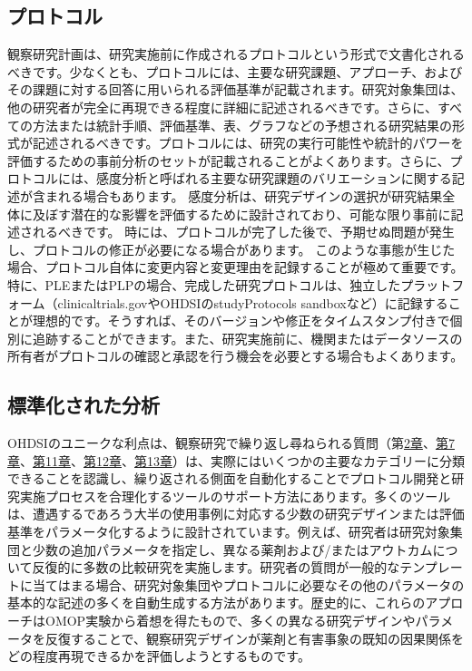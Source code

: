 \documentclass[
  11pt]{book}
\theoremstyle{definition}
\theoremstyle{definition}
\theoremstyle{definition}
\theoremstyle{definition}
\theoremstyle{remark}
\begin{document}
\subsection{プロトコル}\label{ux30d7ux30edux30c8ux30b3ux30eb}


観察研究計画は、研究実施前に作成されるプロトコルという形式で文書化されるべきです。少なくとも、プロトコルには、主要な研究課題、アプローチ、およびその課題に対する回答に用いられる評価基準が記載されます。研究対象集団は、他の研究者が完全に再現できる程度に詳細に記述されるべきです。さらに、すべての方法または統計手順、評価基準、表、グラフなどの予想される研究結果の形式が記述されるべきです。プロトコルには、研究の実行可能性や統計的パワーを評価するための事前分析のセットが記載されることがよくあります。さらに、プロトコルには、感度分析と呼ばれる主要な研究課題のバリエーションに関する記述が含まれる場合もあります。 感度分析は、研究デザインの選択が研究結果全体に及ぼす潜在的な影響を評価するために設計されており、可能な限り事前に記述されるべきです。 時には、プロトコルが完了した後で、予期せぬ問題が発生し、プロトコルの修正が必要になる場合があります。 このような事態が生じた場合、プロトコル自体に変更内容と変更理由を記録することが極めて重要です。特に、PLEまたはPLPの場合、完成した研究プロトコルは、独立したプラットフォーム（clinicaltrials.govやOHDSIのstudyProtocols sandboxなど）に記録することが理想的です。そうすれば、そのバージョンや修正をタイムスタンプ付きで個別に追跡することができます。また、研究実施前に、機関またはデータソースの所有者がプロトコルの確認と承認を行う機会を必要とする場合もよくあります。

\subsection{標準化された分析}\label{ux6a19ux6e96ux5316ux3055ux308cux305fux5206ux6790}

OHDSIのユニークな利点は、観察研究で繰り返し尋ねられる質問（第\href{https://ohdsi.github.io/TheBookOfOhdsi/WhereToBegin.html\#WhereToBegin}{2章}、\href{https://ohdsi.github.io/TheBookOfOhdsi/DataAnalyticsUseCases.html\#DataAnalyticsUseCases}{第7章}、\href{https://ohdsi.github.io/TheBookOfOhdsi/Characterization.html\#Characterization}{第11章}、\href{https://ohdsi.github.io/TheBookOfOhdsi/PopulationLevelEstimation.html\#PopulationLevelEstimation}{第12章}、\href{https://ohdsi.github.io/TheBookOfOhdsi/PatientLevelPrediction.html\#PatientLevelPrediction}{第13章}）は、実際にはいくつかの主要なカテゴリーに分類できることを認識し、繰り返される側面を自動化することでプロトコル開発と研究実施プロセスを合理化するツールのサポート方法にあります。多くのツールは、遭遇するであろう大半の使用事例に対応する少数の研究デザインまたは評価基準をパラメータ化するように設計されています。例えば、研究者は研究対象集団と少数の追加パラメータを指定し、異なる薬剤および/またはアウトカムについて反復的に多数の比較研究を実施します。研究者の質問が一般的なテンプレートに当てはまる場合、研究対象集団やプロトコルに必要なその他のパラメータの基本的な記述の多くを自動生成する方法があります。歴史的に、これらのアプローチはOMOP実験から着想を得たもので、多くの異なる研究デザインやパラメータを反復することで、観察研究デザインが薬剤と有害事象の既知の因果関係をどの程度再現できるかを評価しようとするものです。
\end{document}
